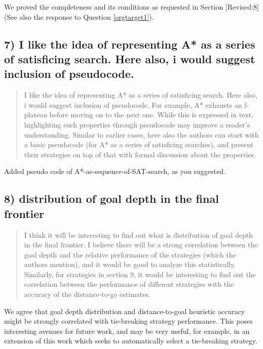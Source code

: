 \documentclass{article}
\begin{document}
We proved the completeness and its conditions as requested in Section [Revised:8] (See also the response to Question \ref{orgtarget1}).

\subsection{7) I like the idea of representing A* as a series of satisficing search. Here also, i would suggest inclusion of pseudocode.}
\label{sec:orgheadline21}

\begin{quote}
 I like the idea of representing A* as a series of satisficing
search. Here also, i would suggest inclusion of pseudocode. For
example, A* exhausts an f-plateau before moving on to the next one.
While this is expressed in text, highlighting such properties through
pseudocode may improve a reader's understanding. Similar to earlier
cases, here also the authors can start with a basic pseudocode (for A*
as a series of satisficing searches), and present their strategies on
top of that with formal discussion about the properties.
\end{quote}

Added pseudo code of A*-as-sequence-of-SAT-search, as you suggested.

\subsection{8) distribution of goal depth in the final frontier}
\label{sec:orgheadline22}

\begin{quote}
 I think it will be interesting to find out what is distribution of
goal depth in the final frontier. I believe there will be a strong
correlation between the goal depth and the relative performance of the
strategies (which the authors mention), and it would be good to
analyze this statistically. Similarly, for strategies in section 9, it
would be interesting to find out the correlation between the
performance of different strategies with the accuracy of the
distance-to-go estimates.
\end{quote}

We agree that goal depth distribution
and distance-to-goal heuristic accuracy might be strongly correlated with tie-breaking strategy performance.
This poses interesting avenues for future work, 
and may be very useful, for example, in an extension of this work which 
seeks to automatically select a tie-breaking strategy.  
\end{document}
